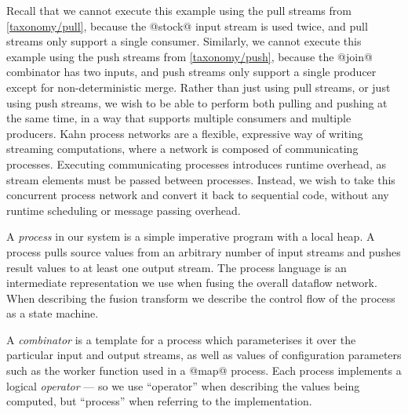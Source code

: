 Recall that we cannot execute this example using the pull streams from \autoref{taxonomy/pull}, because the @stock@ input stream is used twice, and pull streams only support a single consumer.
Similarly, we cannot execute this example using the push streams from \autoref{taxonomy/push}, because the @join@ combinator has two inputs, and push streams only support a single producer except for non-deterministic merge.
Rather than just using pull streams, or just using push streams, we wish to be able to perform both pulling and pushing at the same time, in a way that supports multiple consumers and multiple producers.
Kahn process networks \citep{kahn1976coroutines} are a flexible, expressive way of writing streaming computations, where a network is composed of communicating processes.
Executing communicating processes introduces runtime overhead, as stream elements must be passed between processes.
Instead, we wish to take this concurrent process network and convert it back to sequential code, without any runtime scheduling or message passing overhead.

%

A \emph{process} in our system is a simple imperative program with a local heap.
A process pulls source values from an arbitrary number of input streams and pushes result values to at least one output stream.
The process language is an intermediate representation we use when fusing the overall dataflow network.
When describing the fusion transform we describe the control flow of the process as a state machine.

A \emph{combinator} is a template for a process which parameterises it over the particular input and output streams, as well as values of configuration parameters such as the worker function used in a @map@ process.
Each process implements a logical \emph{operator} --- so we use ``operator'' when describing the values being computed, but ``process'' when referring to the implementation.


